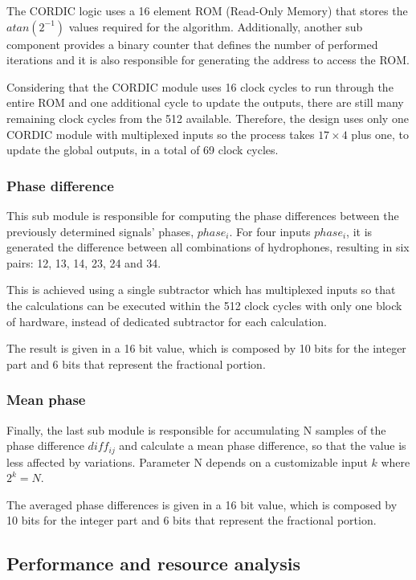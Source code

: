 The CORDIC logic uses a 16 element ROM (Read-Only Memory) that stores the $atan(2^{-1})$ values required for the algorithm. Additionally, another sub component provides a binary counter that defines the number of performed iterations and it is also responsible for generating the address to access the ROM. 

Considering that the CORDIC module uses 16 clock cycles to run through the entire ROM and one additional cycle to update the outputs, there are still many remaining clock cycles from the 512 available. Therefore, the design uses only one CORDIC module with multiplexed inputs so the process takes $17 \times 4$ plus one, to update the global outputs, in a total of 69 clock cycles.

\subsubsection{Phase difference}

This sub module is responsible for computing the phase differences between the previously determined signals' phases, $phase_i$. For four inputs $phase_i$, it is generated the difference between all combinations of hydrophones, resulting in six pairs: 12, 13, 14, 23, 24 and 34.

This is achieved using a single subtractor which has multiplexed inputs so that the calculations can be executed within the 512 clock cycles with only one block of hardware, instead of dedicated subtractor for each calculation. 

The result is given in a 16 bit value, which is composed by 10 bits for the integer part and 6 bits that represent the fractional portion. 

\subsubsection{Mean phase}

Finally, the last sub module is responsible for accumulating N samples of the phase difference $diff_{ij}$ and calculate a mean phase difference, so that the value is less affected by variations.  Parameter N depends on a customizable input $k$ where $2^k = N$. 

The averaged phase differences is given in a 16 bit value, which is composed by 10 bits for the integer part and 6 bits that represent the fractional portion. 

\subsection{Performance and resource analysis}

